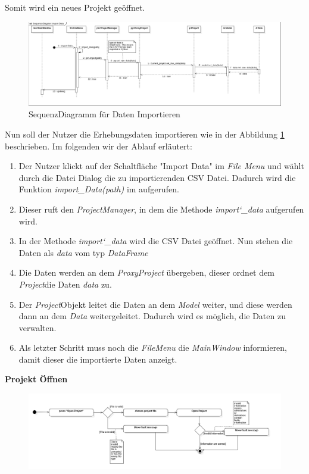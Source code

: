 \documentclass{article}
\begin{document}
\begin{itemize}
Somit wird ein neues Projekt geöffnet.
\begin{figure}[H]%
    \includegraphics[width=15cm]{entwurf/Entwurf_dokument/img/Alissa/SQImportDataFinal.png}
    \caption{SequenzDiagramm für Daten Importieren}
    \label{sq:importData}
\end{figure}
Nun soll der Nutzer die Erhebungsdaten importieren wie in der Abbildung \ref{sq:importData} beschrieben. Im folgenden wir der Ablauf erläutert:
\begin{enumerate}
    \item[1.] Der Nutzer klickt auf der Schaltfläche "Import Data" im \textit{File Menu} und wählt durch die Datei Dialog die zu importierenden CSV Datei. Dadurch wird die Funktion \textit{import_Data(path)} im \textitFileMenu{} aufgerufen.
    \item[2.] Dieser ruft den \textit{ProjectManager}, in dem die Methode \textit{import\char`_data} aufgerufen wird.
    \item[3.] In der Methode \textit{import\char`_data} wird die CSV Datei geöffnet. Nun stehen die Daten als \textit{data} vom typ \textit{DataFrame}
    \item[4.] Die Daten werden an dem \textit{ProxyProject} übergeben, dieser ordnet dem \textit{Project}\textendash die Daten \textit{data} zu.
    \item[5.] Der \textit{Project}\textendash Objekt leitet die Daten an dem \textit{Model} weiter, und diese werden dann an dem \textit{Data} weitergeleitet. Dadurch wird es möglich, die Daten zu verwalten.
    \item[6.] Als letzter Schritt muss noch die \textit{FileMenu} die \textit{MainWindow} informieren, damit dieser die importierte Daten anzeigt. 
\end{enumerate}
\newpage
\textbf{\large{Projekt Öffnen}}
\begin{figure}[H]%
    \centering
    \includegraphics[width=13cm]{entwurf/Entwurf_dokument/img/Alissa/OpenProjectAD.png}

\end{figure}
\end{itemize}
\end{document}
